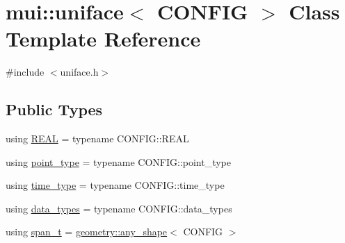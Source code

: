 \hypertarget{classmui_1_1uniface}{}\section{mui\+:\+:uniface$<$ C\+O\+N\+F\+IG $>$ Class Template Reference}
\label{classmui_1_1uniface}


{\ttfamily \#include $<$uniface.\+h$>$}

\subsection*{Public Types}
\begin{DoxyCompactItemize}
\item 
using \hyperlink{classmui_1_1uniface_a870dace227e6e5273505401ef33733ef}{R\+E\+AL} = typename C\+O\+N\+F\+I\+G\+::\+R\+E\+AL
\item 
using \hyperlink{classmui_1_1uniface_abc356ab801269c69e38dc07179f85ef9}{point\+\_\+type} = typename C\+O\+N\+F\+I\+G\+::point\+\_\+type
\item 
using \hyperlink{classmui_1_1uniface_a65cbecf1936d7d61cb45f14b1138dc07}{time\+\_\+type} = typename C\+O\+N\+F\+I\+G\+::time\+\_\+type
\item 
using \hyperlink{classmui_1_1uniface_a9528cdfb58805e97fd58dd991d850360}{data\+\_\+types} = typename C\+O\+N\+F\+I\+G\+::data\+\_\+types
\item 
using \hyperlink{classmui_1_1uniface_a9aeea388b73b17bdc634eb1c96cbfeff}{span\+\_\+t} = \hyperlink{classmui_1_1geometry_1_1any__shape}{geometry\+::any\+\_\+shape}$<$ C\+O\+N\+F\+IG $>$
\end{DoxyCompactItemize}
